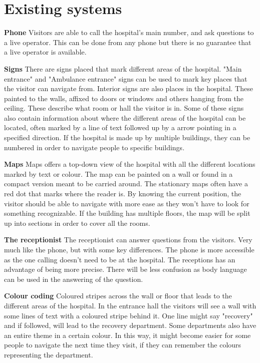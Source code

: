 \section{Existing systems} %
\label{sec:existing_systems}



\textbf{Phone}
Visitors are able to call the hospital's main number, and ask questions to a live operator. This can be done from any phone but there is no guarantee that a live operator is available.

\textbf{Signs}
There are signs placed that mark different areas of the hospital. "Main entrance" and "Ambulance entrance" signs can be used to mark key places that the visitor can navigate from\cite{art_Osborne}.
Interior signs are also places in the hospital. These painted to the walls, affixed to doors or windows and others hanging from the ceiling. These describe what room or hall the visitor is in. Some of these signs also contain information about where the different areas of the hospital can be located, often marked by a line of text followed up by a arrow pointing in a specified direction. If the hospital is made up by multiple buildings, they can be numbered in order to navigate people to specific buildings.

\textbf{Maps}
Maps offers a top-down view of the hospital with all the different locations marked by text or colour\cite{art_Osborne}. The map can be painted on a wall or found in a compact version meant to be carried around. The stationary maps often have a red dot that marks where the reader is. By knowing the current position, the visitor should be able to navigate with more ease as they won't have to look for something recognizable. If the building has multiple floors, the map will be split up into sections in order to cover all the rooms.

\textbf{The receptionist}
The receptionist can answer questions from the visitors. Very much like the phone, but with some key differences. The phone is more accessible as the one calling doesn't need to be at the hospital. The receptions has an advantage of being more precise. There will be less confusion as body language can be used in the answering of the question.

\textbf{Colour coding}
Coloured stripes across the wall or floor that leads to the different areas of the hospital. In the entrance hall the visitors will see a wall with some lines of text with a coloured stripe behind it. One line might say "recovery" and if followed, will lead to the recovery department. Some departments also have an entire theme in a certain colour. In this way, it might become easier for some people to navigate the next time they visit, if they can remember the colours representing the department. 

